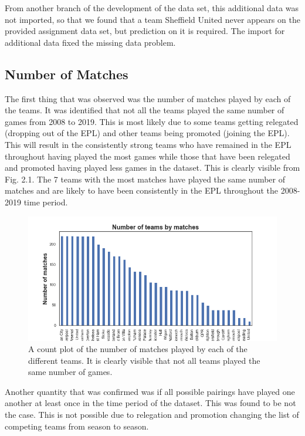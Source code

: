 \documentclass[a4paper,12pt]{article}
\begin{document}
	From another branch of the development of the data set, this additional data was not imported, so that we found that a team Sheffield United never appears on the provided assignment data set, but prediction on it is required. The import for additional data fixed the missing data problem.
	
	\subsection{Number of Matches}
	
	The first thing that was observed was the number of matches played by each of the teams. It was identified that not all the teams played the same number of games from 2008 to 2019. This is most likely due to some teams getting relegated (dropping out of the EPL) and other teams being promoted (joining the EPL). This will result in the consistently strong teams who have remained in the EPL throughout having played the most games while those that have been relegated and promoted having played less games in the dataset. This is clearly visible from Fig. 2.1. The 7 teams with the most matches have played the same number of matches and are likely to have been consistently in the EPL throughout the 2008-2019 time period.  
	
	\begin{figure}[H]
		\renewcommand\thefigure{2.1}
		\centering
		
		\includegraphics[scale=0.6]{num_of_matches.png}
		\caption{A count plot of the number of matches played by each of the different teams. It is clearly visible that not all teams played the same number of games.}
	\end{figure}
	
	Another quantity that was confirmed was if all possible pairings have played one another at least once in the time period of the dataset. This was found to be not the case. This is not possible due to relegation and promotion changing the list of competing teams from season to season.  
	
\end{document}
